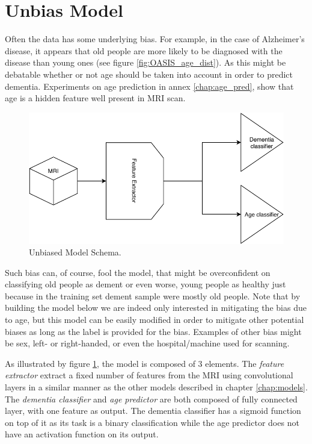 \section{Unbias Model}
\label{sec:unbias_model}

Often the data has some underlying bias. For example, in the case of Alzheimer’s disease, it appears that old people are more likely to be diagnosed with the disease than young ones (see figure \ref{fig:OASIS_age_dist}). As this might be debatable whether or not age should be taken into account in order to predict dementia. Experiments on age prediction in annex \ref{chap:age_pred}, show that age is a hidden feature well present in MRI scan.

\begin{figure}
 \centering
 \includegraphics[width=.9\linewidth]{figures/models/Unbias_model.pdf}
 \captionsetup{width=.9\linewidth}
 \caption[UnbiasModelSchema]{Unbiased Model Schema.}
 \label{fig:unbias_model_schema}
\end{figure}

Such bias can, of course, fool the model, that might be overconfident on classifying old people as dement or even worse, young people as healthy just because in the training set dement sample were mostly old people.
Note that by building the model below we are indeed only interested in mitigating the bias due to age, but this model can be easily modified in order to mitigate other potential biases as long as the label is provided for the bias. Examples of other bias might be sex, left- or right-handed, or even the hospital/machine used for scanning.


As illustrated by figure \ref{fig:unbias_model_schema}, the model is composed of 3 elements. The \textit{feature extractor} extract a fixed number of features from the MRI using convolutional layers in a similar manner as the other models described in chapter \ref{chap:models}. The \textit{dementia classifier} and \textit{age predictor} are both composed of fully connected layer, with one feature as output. The dementia classifier has a sigmoid function on top of it as its task is a binary classification while the age predictor does not have an activation function on its output.

